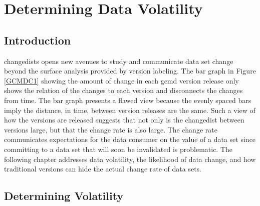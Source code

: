
\chapter{Determining Data Volatility} \label{Volatility}

\section{Introduction}

\Glspl{changedist} opens new avenues to study and communicate data set change beyond the surface analysis provided by version labeling.
The bar graph in Figure \ref{GCMDC1} showing the amount of change in each \gls{gcmd} version release only shows the relation of the \glspl{change} to each \gls{version} and disconnects the \glspl{change} from time.
The bar graph presents a flawed view because the evenly spaced bars imply the distance, in time, between \gls{version} releases are the same.
Such a view of how the \glspl{version} are released suggests that not only is the \gls{changedist} between \glspl{version} large, but that the change rate is also large.
The change rate communicates expectations for the data consumer on the value of a data set since committing to a data set that will soon be invalidated is problematic.
The following chapter addresses data \gls{volatility}, the likelihood of data change, and  how traditional \glspl{version} can hide the actual change rate of data sets.

\section{Determining Volatility}

